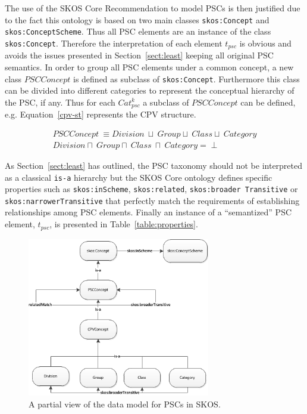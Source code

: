 \begin{itemize}
 The use of the SKOS Core Recommendation to model PSCs is then justified due to the fact this ontology is based on two 
 main classes \texttt{skos:Concept} and \texttt{skos:ConceptScheme}. Thus all PSC elements are 
 an instance of the class \texttt{skos:Concept}. Therefore the interpretation of each element $t_{psc}$ 
 is obvious and avoids the issues presented in Section~\ref{sect:least} keeping all original PSC semantics. In order 
 to group all PSC elements under a common concept, a new class $PSCConcept$ is defined as subclass of 
 \texttt{skos:Concept}. Furthermore this class can be divided into different categories to represent 
 the conceptual hierarchy of the PSC, if any. Thus for each $Cat_{psc}^k$ a subclass of $PSCConcept$ can be defined, e.g. 
 Equation~\ref{cpv-st} represents the CPV structure.
 
 \begin{equation}\label{cpv-st}
 \begin{split}
 PSCConcept\ \equiv Division\ \sqcup\ Group \sqcup\ Class \sqcup\ Category \\
 Division \sqcap\ Group \sqcap\ Class\ \sqcap\ Category = \perp
 \end{split}
\end{equation}

  As Section~\ref{sect:least} has outlined, the PSC taxonomy should not be interpreted as a classical \texttt{is-a} hierarchy but 
  the SKOS Core ontology defines specific properties such as \texttt{skos:inScheme}, \texttt{skos:related}, \texttt{skos:broader Transitive} or
  \texttt{skos:narrowerTransitive} that perfectly match the requirements of establishing relationships among PSC elements. Finally an 
  instance of a ``semantized'' PSC element, $t_{psc}$, is presented in Table~\ref{table:properties}. 
  
 \begin{figure}[!ht]
\centering
	\includegraphics[width=8cm]{./imgs/fig-2}
 \caption{A partial view of the data model for PSCs in SKOS.}
 \label{fig:pscs-data-model}
\end{figure}


\end{itemize}
